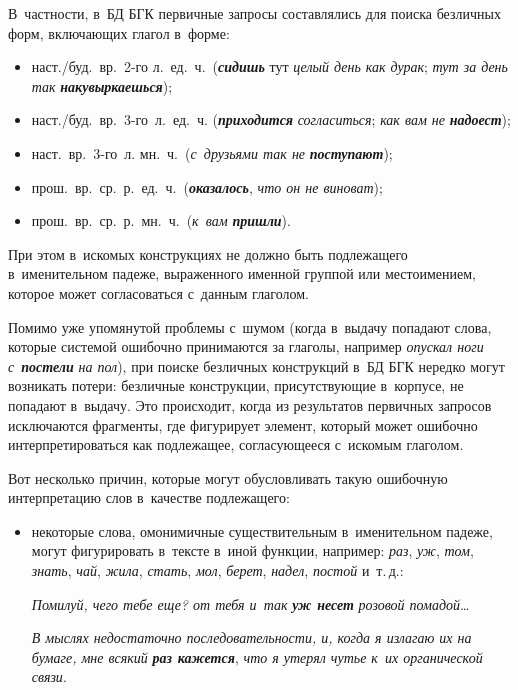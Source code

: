 \begin{multicols}{2}
  В~частности, в~БД БГК первичные запросы составлялись для поиска 
безличных форм, вклю\-ча\-ющих глагол в~форме:
  \begin{itemize}
\item наст./буд.\ вр.\ 2-го л.\ ед.~ч.\ ({\bfseries\textit{сидишь}} тут 
\textit{целый день как дурак}; \textit{тут за день так} 
{\bfseries\textit{накувыркаешься}});
\item наст./буд.\ вр.\ 3-го~л.\ ед.~ч. ({\bfseries\textit{приходится}} 
\textit{согласиться}; \textit{как вам не} {\bfseries\textit{надоест}}); 
\item наст.\ вр.\ 3-го~л. мн.~ч.\ (\textit{с~друзьями так не} 
{\bfseries\textit{поступают}});
\item прош.\ вр.\ ср.\ р.\ ед.~ч.\ ({\bfseries\textit{оказалось}}, \textit{что 
он не виноват});
\item прош.\ вр.\ ср.\ р.\ мн.~ч.\ (\textit{к~вам} 
{\bfseries\textit{пришли}}).
  \end{itemize}
  
  При этом в~искомых конструкциях не должно быть подлежащего 
в~именительном падеже, выраженного именной группой или местоимением, 
которое может согласоваться с~данным глаголом.
  
  Помимо уже упомянутой проблемы с~шумом (когда в~выдачу попадают 
слова, которые системой ошибочно принимаются за глаголы, например 
\textit{опускал ноги с}~{\bfseries\textit{постели}} \textit{на пол}), при поиске 
безличных конструкций в~БД БГК нередко могут возникать потери: безличные 
конструкции, присутствующие в~корпусе, не попадают в~выдачу. Это 
происходит, когда из результатов первичных запросов исключаются 
фрагменты, где фигурирует элемент, который может ошибочно 
интерпретироваться как подлежащее, согласующееся с~искомым глаголом.
  
  Вот несколько причин, которые могут обуслов\-ли\-вать такую ошибочную 
интерпретацию слов в~качестве подлежащего:
  \begin{itemize}
\item некоторые слова, омонимичные существительным в~именительном 
падеже, могут фигурировать в~тексте в~иной функции, например: \textit{раз}, 
\textit{уж}, \textit{том}, \textit{знать}, \textit{чай}, \textit{жила}, 
\textit{стать}, \textit{мол}, \textit{берет}, \textit{надел}, \textit{постой} 
и~т.\,д.:

\textit{Помилуй, чего тебе еще? от тебя и~так} {\bfseries\textit{уж несет}} 
\textit{розовой помадой}\ldots

\textit{В мыслях недостаточно последовательности, и, когда я излагаю их 
на бумаге, мне всякий} {\bfseries\textit{раз кажется}}, \textit{что я утерял 
чутье к~их органической связи}.


\end{itemize}
\end{multicols}
